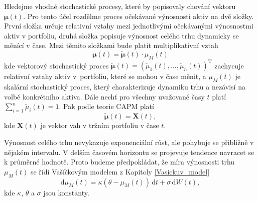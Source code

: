 \documentclass[a4paper,12pt]{report}
\theoremstyle{definition} \newtheorem{definice}[veta]{Definice}
\theoremstyle{remark}
\begin{document}


Hledejme vhodné stochastické procesy, které by popisovaly chování vektoru $\boldsymbol{\mu}(t)$.
Pro tento účel rozdělme proces očekávané výnosnosti aktiv na dvě složky.
První složka určuje relativní vztahy mezi jednotlivými očekávanými výnosnostmi aktiv v portfoliu, druhá složka popisuje výnosnost celého trhu dynamicky se měnící v čase.  
Mezi těmito složkami bude platit multiplikativní vztah
\begin{equation} \label{vynos}
\boldsymbol{\mu}(t) =\tilde{\boldsymbol{\mu}}(t)\cdot \mu_M(t)
\end{equation}
kde
vektorový stochastický proces $\tilde{\boldsymbol{\mu}}(t)=(\tilde{\mu}_1(t),\dots,\tilde{\mu}_n(t))^\mathrm{T}$ zachycuje relativní vztahy aktiv v~portfoliu, které se mohou v čase měnit, a
$\mu_M(t)$ je skalární stochastický proces, který charakterizuje dynamiku trhu a nezávisí na volbě konkrétního aktiva.
Dále nechť pro všechny uvažované časy $t$ platí $\sum_{i=1}^n\tilde{\mu}_i(t)=1$.
Pak podle teorie CAPM platí 
\begin{equation} \label{vahy_mu}
\tilde{\boldsymbol{\mu}}(t)=\boldsymbol{X}(t),
\end{equation}
kde $\boldsymbol{X}(t)$ je vektor vah v tržním portfoliu v čase $t$.

Výnosnost celého trhu nevykazuje exponenciální růst, ale pohybuje se přibližně v nějakém intervalu. 
V delším časovém horizontu se projevuje tendence navracet se k průměrné hodnotě.
Proto budeme předpokládat, že míra výnosnosti trhu $\mu_M(t)$ se řídí Vašíčkovým modelem z Kapitoly \ref{Vasickuv_model}
\begin{equation} 
\mathrm{d}\mu_M(t)=\kappa(\theta-\mu_M(t))\,\mathrm{d}t+\sigma\,\mathrm{d}W(t),
\end{equation}
kde $\kappa$, $\theta$ a $\sigma$ jsou konstanty.
\end{document}
